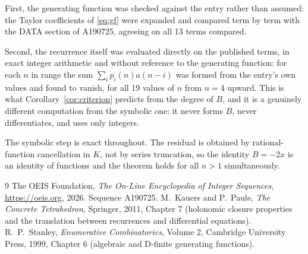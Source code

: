\documentclass[11pt,a4paper]{article}
\theoremstyle{plain}
\theoremstyle{definition}
\begin{document}
First, the generating function was checked against the entry rather than assumed: the
Taylor coefficients of \eqref{eq:gf} were expanded and compared term by term with the DATA
section of A190725, agreeing on all 13 terms compared.

Second, the recurrence itself was evaluated directly on the published terms, in exact
integer arithmetic and without reference to the generating function: for each $n$ in range
the sum $\sum_{i}p_{i}(n)a(n-i)$ was formed from the entry's own values and found to
vanish, for all 19 values of $n$ from $n=4$ upward. This is what
Corollary~\ref{cor:criterion} predicts from the degree of $B$, and it is a genuinely
different computation from the symbolic one: it never forms $B$, never differentiates, and
uses only integers.

The symbolic step is exact throughout. The residual is obtained by rational-function
cancellation in $K$, not by series truncation, so the identity $B=- 2 x$ is an
identity of functions and the theorem holds for all $n>1$ simultaneously.

\begin{thebibliography}{9}
 The OEIS Foundation, \emph{The On-Line Encyclopedia of Integer Sequences},
\url{https://oeis.org}, 2026. Sequence A190725.
 M.~Kauers and P.~Paule, \emph{The Concrete Tetrahedron}, Springer, 2011,
Chapter 7 (holonomic closure properties and the translation between recurrences and
differential equations).
 R.~P.~Stanley, \emph{Enumerative Combinatorics}, Volume 2, Cambridge
University Press, 1999, Chapter 6 (algebraic and D-finite generating functions).
\end{thebibliography}
\end{document}
